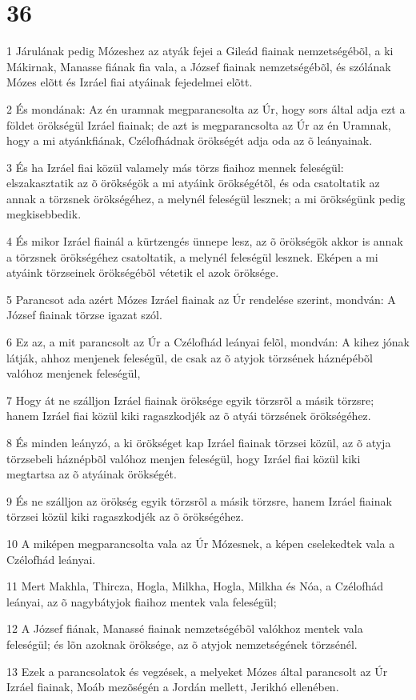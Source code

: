 \chapter{36}

\par 1 Járulának pedig Mózeshez az atyák fejei a Gileád fiainak nemzetségébõl, a ki Mákirnak, Manasse fiának fia vala, a József fiainak nemzetségébõl, és szólának Mózes elõtt és Izráel fiai atyáinak fejedelmei elõtt.
\par 2 És mondának: Az én uramnak megparancsolta az Úr, hogy sors által adja ezt a földet örökségül Izráel fiainak; de azt is megparancsolta az Úr az én Uramnak, hogy a mi atyánkfiának, Czélofhádnak örökségét adja oda az õ leányainak.
\par 3 És ha Izráel fiai közül valamely más törzs fiaihoz mennek feleségül: elszakasztatik az õ örökségök a mi atyáink örökségétõl, és oda csatoltatik az annak a törzsnek örökségéhez, a melynél feleségül lesznek; a mi örökségünk pedig megkisebbedik.
\par 4 És mikor Izráel fiainál a kürtzengés ünnepe lesz, az õ örökségök akkor is annak a törzsnek örökségéhez csatoltatik, a melynél feleségül lesznek. Eképen a mi atyáink törzseinek örökségébõl vétetik el azok öröksége.
\par 5 Parancsot ada azért Mózes Izráel fiainak az Úr rendelése szerint, mondván: A József fiainak törzse igazat szól.
\par 6 Ez az, a mit parancsolt az Úr a Czélofhád leányai felõl, mondván: A kihez jónak látják, ahhoz menjenek feleségül, de csak az õ atyjok törzsének háznépébõl valóhoz menjenek feleségül,
\par 7 Hogy át ne szálljon Izráel fiainak öröksége egyik törzsrõl a másik törzsre; hanem Izráel fiai közül kiki ragaszkodjék az õ atyái törzsének örökségéhez.
\par 8 És minden leányzó, a ki örökséget kap Izráel fiainak törzsei közül, az õ atyja törzsebeli háznépbõl valóhoz menjen feleségül, hogy Izráel fiai közül kiki megtartsa az õ atyáinak örökségét.
\par 9 És ne szálljon az örökség egyik törzsrõl a másik törzsre, hanem Izráel fiainak törzsei közül kiki ragaszkodjék az õ örökségéhez.
\par 10 A miképen megparancsolta vala az Úr Mózesnek, a képen cselekedtek vala a Czélofhád leányai.
\par 11 Mert Makhla, Thircza, Hogla, Milkha, Hogla, Milkha és Nóa, a Czélofhád leányai, az õ nagybátyjok fiaihoz mentek vala feleségül;
\par 12 A József fiának, Manassé fiainak nemzetségébõl valókhoz mentek vala feleségül; és lõn azoknak öröksége, az õ atyjok nemzetségének törzsénél.
\par 13 Ezek a parancsolatok és vegzések, a melyeket Mózes által parancsolt az Úr Izráel fiainak, Moáb mezõségén a Jordán mellett, Jerikhó ellenében.


